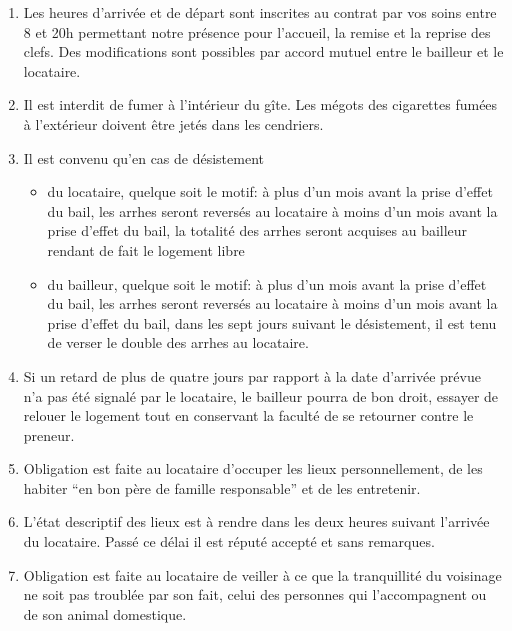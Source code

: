 \documentclass[a4paper,11pt]{article}
\begin{document}
\begin{enumerate}

\item Les heures d’arrivée et de départ sont inscrites  au contrat par vos soins entre 8 et 20h permettant notre présence pour l’accueil, la remise et la reprise des clefs.
Des modifications sont possibles par accord mutuel entre le bailleur et le locataire.
 


\item Il est interdit de fumer à l’intérieur du gîte. Les mégots des cigarettes fumées à l'extérieur doivent être jetés dans les cendriers.

\item Il est convenu qu'en cas de désistement \\


\begin{itemize}
\item du locataire, quelque soit le motif:
\subitem à plus d'un mois avant la prise d'effet du bail, les arrhes seront reversés au locataire
\subitem à moins d'un mois avant la prise d'effet du bail, la totalité des arrhes seront acquises au bailleur rendant de fait le logement libre
\item du bailleur, quelque soit le motif:
\subitem à plus d'un mois avant la prise d'effet du bail, les arrhes seront reversés au locataire
\subitem à moins d'un mois avant la prise d'effet du bail, dans les sept jours suivant le désistement, il est tenu de verser le double des arrhes au locataire.
\end{itemize}



\item Si un retard de plus de quatre jours par rapport à la date d’arrivée prévue n’a pas été signalé par le locataire, le bailleur pourra de bon droit, essayer de relouer le logement tout en conservant la faculté de se retourner contre le preneur.



\item Obligation est faite au locataire d’occuper les lieux personnellement, de les habiter “en bon père de famille responsable” et de les entretenir.

\item L'état descriptif des lieux est à rendre dans les deux heures suivant l'arrivée du locataire. Passé ce délai il est réputé accepté et sans remarques.


\item Obligation est faite au locataire de veiller à ce que la tranquillité du voisinage ne soit pas troublée par son fait, celui des personnes qui l'accompagnent ou de son animal domestique.


\end{enumerate}
\end{document}

